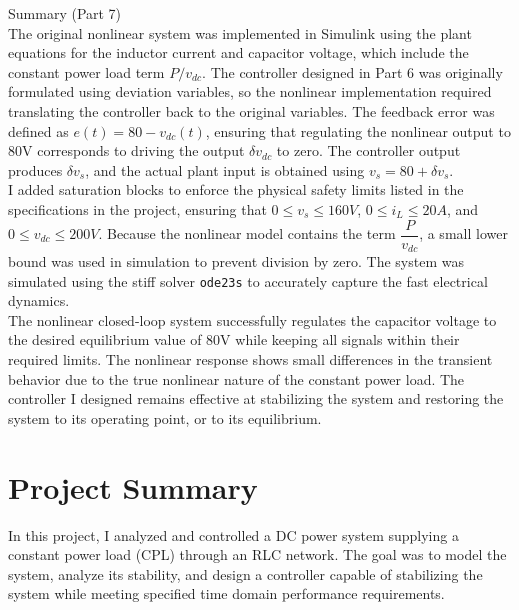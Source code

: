 \documentclass[12pt]{article}
\begin{document}
\begin{tcolorbox}[enhanced, frame hidden, colback=white, borderline west={1pt}{0pt}{gray}]
  \large{Summary (Part 7)}\normalsize{}\\
  The original nonlinear system was implemented in Simulink using the plant equations for the inductor current and capacitor voltage, which include the constant power load term $P/v_{dc}$. The controller designed in Part 6 was originally formulated using deviation variables, so the nonlinear implementation required translating the controller back to the original variables. The feedback error was defined as $e(t) = 80-v_{dc}(t)$, ensuring that regulating the nonlinear output to 80V corresponds to driving the output $\delta v_{dc}$ to zero. The controller output produces $\delta v_s$, and the actual plant input is obtained using $v_s = 80 + \delta v_s$. \\

  I added saturation blocks to enforce the physical safety limits listed in the specifications in the project, ensuring that $0 \leq v_s \leq 160V$, $0 \leq i_L \leq 20A$, and $0 \leq v_{dc} \leq 200V$. Because the nonlinear model contains the term $\dfrac{P}{v_{dc}}$, a small lower bound was used in simulation to prevent division by zero. The system was simulated using the stiff solver \texttt{ode23s} to accurately capture the fast electrical dynamics. \\

  The nonlinear closed-loop system successfully regulates the capacitor voltage to the desired equilibrium value of 80V while keeping all signals within their required limits. The nonlinear response shows small differences in the transient behavior due to the true nonlinear nature of the constant power load. The controller I designed remains effective at stabilizing the system and restoring the system to its operating point, or to its equilibrium. 
\end{tcolorbox}

\newpage

\section{Project Summary}
In this project, I analyzed and controlled a DC power system supplying a constant power load (CPL) through an RLC network. The goal was to model the system, analyze its stability, and design a controller capable of stabilizing the system while meeting specified time domain performance requirements.\\
\end{document}
